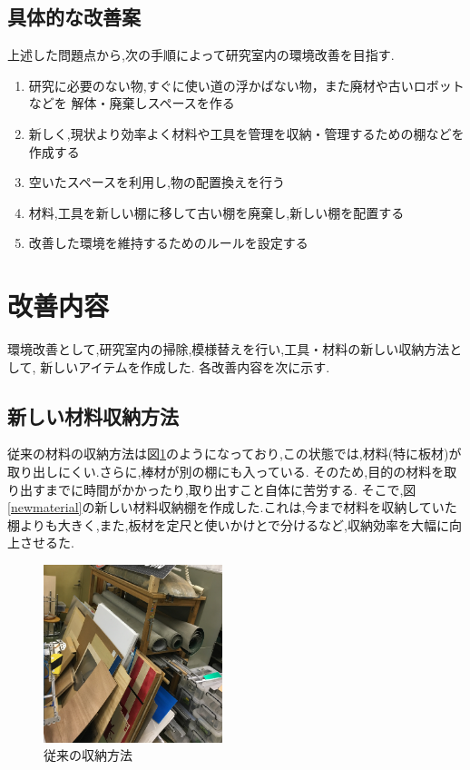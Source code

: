 \documentclass[twocolumn,11pt]{abst}
\begin{document}
\subsection{具体的な改善案}
上述した問題点から,次の手順によって研究室内の環境改善を目指す.
\begin{enumerate}
\item 研究に必要のない物,すぐに使い道の浮かばない物，また廃材や古いロボットなどを
解体・廃棄しスペースを作る
\item 新しく,現状より効率よく材料や工具を管理を収納・管理するための棚などを作成する
\item 空いたスペースを利用し,物の配置換えを行う
\item 材料,工具を新しい棚に移して古い棚を廃棄し,新しい棚を配置する
\item 改善した環境を維持するためのルールを設定する
\end{enumerate}

\section{改善内容}
環境改善として,研究室内の掃除,模様替えを行い,工具・材料の新しい収納方法として,
新しいアイテムを作成した.
各改善内容を次に示す.

\subsection{新しい材料収納方法}
従来の材料の収納方法は図\ref{material}のようになっており,この状態では,材料(特に板材)が
取り出しにくい.さらに,棒材が別の棚にも入っている.
そのため,目的の材料を取り出すまでに時間がかかったり,取り出すこと自体に苦労する.
そこで,図\ref{newmaterial}の新しい材料収納棚を作成した.これは,今まで材料を収納していた
棚よりも大きく,また,板材を定尺と使いかけとで分けるなど,収納効率を大幅に向上させるた.

\begin{figure}[htbp]
  \begin{center}
   \includegraphics[width=52mm]{materials.png}
  \end{center}
 \caption{従来の収納方法}
\label{material}
\end{figure}
\end{document}
